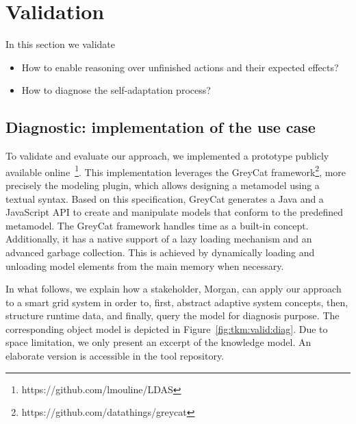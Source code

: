 \section{Validation}
\label{sec:tkm:validation}

In this section we validate 

\begin{itemize}
	\item How to enable reasoning over unfinished actions and their expected effects?
	\item How to diagnose the self-adaptation process?
\end{itemize}


%

\subsection{Diagnostic: implementation of the use case}
To validate and evaluate our approach, we implemented a prototype publicly available online~\footnote{https://github.com/lmouline/LDAS}.
This implementation leverages the GreyCat framework\footnote{https://github.com/datathings/greycat}, more precisely the modeling plugin, which allows designing a metamodel using a textual syntax.
Based on this specification, GreyCat generates a Java and a JavaScript API to create and manipulate models that conform to the predefined metamodel.
The GreyCat framework handles time as a built-in concept.
Additionally, it has a native support of a lazy loading mechanism and an advanced garbage collection.
This is achieved by dynamically loading and unloading model elements from the main memory when necessary.

In what follows, we explain how a stakeholder, Morgan, can apply our approach to a smart grid system in order to, first, abstract adaptive system concepts, then, structure runtime data, and finally, query the model for diagnosis purpose.
The corresponding object model is depicted in Figure~\ref{fig:tkm:valid:diag}.
Due to space limitation, we only present an excerpt of the knowledge model.
An elaborate version is accessible in the tool repository.

